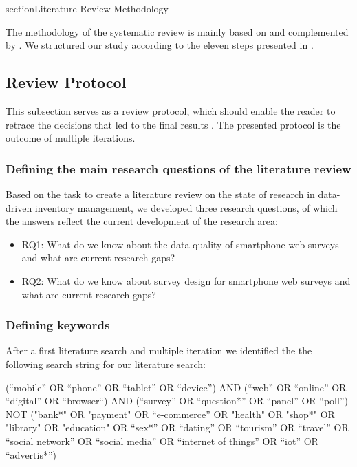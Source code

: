 section{Literature Review Methodology}
\label{sec: methodology}

The methodology of the systematic review is mainly based on \cite{silva_systematic_2016} and complemented by \cite{moher_preferred_2009,thome_conducting_2016,durach_new_2017,snyder_literature_2019}. We structured our study according to the eleven steps presented in \cite{silva_systematic_2016}.

\subsection{Review Protocol}

This subsection serves as a review protocol, which should enable the reader to retrace the decisions that led to the final results \cite{moher_preferred_2009}. The presented protocol is the outcome of multiple iterations.

\subsubsection{Defining the main research questions of the literature review}

Based on the task to create a literature review on the state of research in data-driven inventory management, we developed three research questions, of which the answers reflect the current development of the research area:

\begin{itemize}
    \item RQ1: What do we know about the data quality of smartphone web surveys and what are current research gaps?
    \item RQ2: What do we know about survey design for smartphone web surveys and what are current research gaps?
\end{itemize}

\subsubsection{Defining keywords}
\label{subsubsec: Defining keywords}

After a first literature search and multiple iteration we identified the the following search string for our literature search:

\noindent (“mobile” OR “phone” OR “tablet” OR “device”) AND (“web” OR “online” OR “digital” OR “browser“) AND (“survey” OR “question*” OR “panel” OR “poll”) NOT ("bank*" OR "payment" OR “e-commerce” OR "health" OR "shop*" OR "library" OR "education" OR “sex*” OR “dating” OR “tourism” OR “travel” OR “social network” OR “social media” OR “internet of things” OR “iot” OR “advertis*”)

